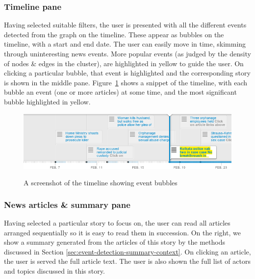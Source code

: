 \subsubsection*{Timeline pane}
Having selected suitable filters, the user is presented with all the different events detected from the graph on the timeline. These appear as 
bubbles on the timeline, with a start and end date. The user can easily move in time, skimming through uninteresting news events.
More popular events (as judged by the density of nodes \& edges in the cluster), are highlighted in yellow to guide the user.
On clicking a particular bubble, that event is highlighted and the corresponding story is shown in the middle pane. Figure~\ref{fig:timeline-closeup}
shows a snippet of the timeline, with each bubble an event (one or more articles) at some time, and the most significant bubble highlighted in yellow.
\begin{figure}
\caption{A screenshot of the timeline showing event bubbles}
\includegraphics[scale=0.34]{figures/timeline2.png}
\label{fig:timeline-closeup}
\end{figure}
\subsubsection*{News articles \& summary pane}\label{sec:filter-summarization}
Having selected a particular story to focus on, the user can read all articles arranged sequentially so it is easy to read them in succession.
On the right, we show a summary generated from the articles of this story by the methods discussed in Section \ref{sec:event-detection-summary-context}.
On clicking an article, the user is served the full article text. The user is also shown the full list of actors and topics discussed in this story.
